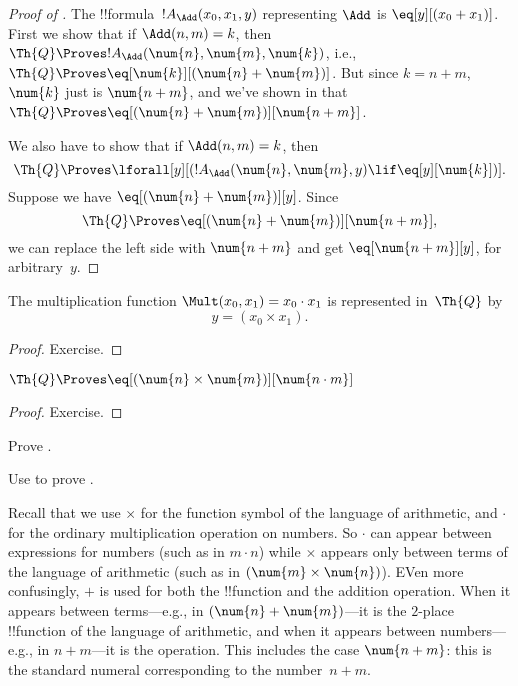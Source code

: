 \documentclass[../../../include/open-logic-section]{subfiles}
\begin{document}
\begin{proof}[Proof of ]
The !!{formula}~$!A_\Add(x_0, x_1, y)$ representing $\Add$ is
$\eq[y][(x_0 + x_1)]$. First we show that if $\Add(n, m) = k$, then
$\Th{Q} \Proves !A_\Add(\num{n}, \num{m}, \num{k})$, i.e., $\Th{Q}
\Proves \eq[\num{k}][(\num{n} + \num{m})]$. But since $k = n + m$,
$\num{k}$ just is $\num{n+m}$, and we've shown in
 that $\Th{Q} \Proves \eq[(\num{n} +
  \num{m})][\num{n+m}]$.

We also have to show that if $\Add(n, m) = k$, then
\[
\Th{Q} \Proves \lforall[y][(!A_\Add(\num{n}, \num{m}, y) \lif
  \eq[y][\num{k}])].
\]
Suppose we have $\eq[(\num{n} + \num{m})][y]$. Since
\[
\Th{Q} \Proves \eq[(\num{n}+\num{m})][\num{n+m}],
\]
we can replace the left side with $\num{n+m}$ and get
$\eq[\num{n+m}][y]$, for arbitrary~$y$.
\end{proof}

\begin{prop}
The multiplication function $\Mult(x_0, x_1) = x_0 \cdot x_1$ is represented
in~$\Th{Q}$ by
\[
y = (x_0 \times x_1).
\]
\end{prop}

\begin{proof} Exercise. \end{proof}

\begin{lem}
$\Th{Q} \Proves \eq[(\num{n} \times \num{m})][\num{n \cdot m}]$
\end{lem}

\begin{proof} Exercise. \end{proof}

\begin{prob}
Prove .
\end{prob}

\begin{prob}
Use  to prove
.
\end{prob}

\begin{explain}
  Recall that we use $\times$ for the function symbol of the language
  of arithmetic, and $\cdot$ for the ordinary multiplication operation
  on numbers. So $\cdot$ can appear between expressions for numbers
  (such as in $m \cdot n$) while $\times$ appears only between terms
  of the language of arithmetic (such as in $(\num{m} \times
  \num{n})$).  EVen more confusingly, $+$ is used for both the
  !!{function} and the addition operation. When it appears between
  terms---e.g., in $(\num{n} + \num{m})$---it is the $2$-place
  !!{function} of the language of arithmetic, and when it appears
  between numbers---e.g., in $n+m$---it is the operation. This
  includes the case $\num{n+m}$: this is the standard numeral
  corresponding to the number~$n+m$.
\end{explain}
\end{document}
